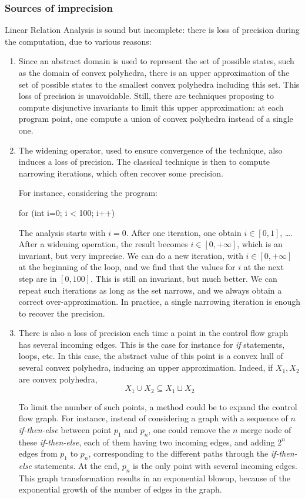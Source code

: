\documentclass[a4paper,english,titlepage,11pt]{report}
\begin{document}
\subsubsection{Sources of imprecision}
 \label{multigraph}
Linear Relation Analysis is sound but incomplete: there is loss of precision
during the computation, due to various reasons:
\begin{enumerate}
\item Since an abstract domain is used to represent the set of possible states,
such as the domain of convex polyhedra, there is an upper approximation of the
set of possible states to the smallest convex polyhedra including this set. This
loss of precision is unavoidable. Still, there are techniques proposing to
compute disjunctive invariants \cite{GulwaniZ10} to limit this upper approximation: at each
program point, one compute a union of convex polyhedra instead of a single
one.
\item The widening operator, used to ensure convergence of the technique,
also induces a loss of precision. The classical technique is then to compute
narrowing iterations, which often recover some precision. 

For instance, considering the program:
\begin{C}
for (int i=0; i < 100; i++) {
}
\end{C}
The analysis starts with $i=0$. After one iteration, one obtain $i \in
[0,1]$, \dots. After a widening operation, the result becomes $i \in [0,
+\infty]$, which is an invariant, but very imprecise. We can do a new iteration,
with $i\in [0, +\infty]$ at the beginning of the loop, and we find that the
values for $i$ at the next step are in $[0, 100]$. This is still an invariant,
but much better. We can repeat such iterations as long as the set narrows, and
we always obtain a correct over-approximation.
In practice, a single narrowing iteration is enough to recover the precision.

\item There is also a loss of precision each time a point in the control flow
graph has several incoming edges. This is the case for instance for
\emph{if} statements, loops, etc. In this case, the abstract value of this point
is a convex hull of several convex polyhedra, inducing an upper approximation.
Indeed, if $X_1, X_2$ are convex polyhedra,
$$X_1 \cup X_2 \subseteq X_1 \sqcup X_2$$

To limit the number of such points, a method could be
to expand the control flow graph. For instance, instead of considering a graph
with a sequence of $n$ \emph{if-then-else} between point $p_1$ and $p_n$, one could remove the $n$ merge node
of these \emph{if-then-else}, each of them having two incoming edges, and adding 
$2^n$ edges from $p_1$ to $p_n$, corresponding to the different paths through
the \emph{if-then-else} statements. At the end, $p_n$ is the only point with
several incoming edges. This graph transformation results in an exponential
blowup, because of the exponential growth of the number of edges in the graph.
\end{enumerate}
\end{document}
